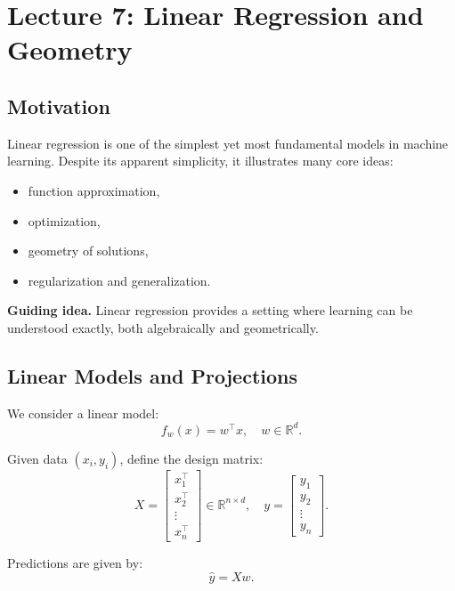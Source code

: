 \section{Lecture 7: Linear Regression and Geometry}

\subsection{Motivation}

Linear regression is one of the simplest yet most fundamental models in machine learning. Despite its apparent simplicity, it illustrates many core ideas:

\begin{itemize}
    \item function approximation,
    \item optimization,
    \item geometry of solutions,
    \item regularization and generalization.
\end{itemize}

\medskip

\noindent
\textbf{Guiding idea.}  
Linear regression provides a setting where learning can be understood exactly, both algebraically and geometrically.

\subsection{Linear Models and Projections}

We consider a linear model:
\[
f_w(x) = w^\top x, \quad w \in \mathbb{R}^d.
\]

\medskip

\noindent
Given data $(x_i, y_i)$, define the design matrix:
\[
X =
\begin{bmatrix}
x_1^\top \\
x_2^\top \\
\vdots \\
x_n^\top
\end{bmatrix}
\in \mathbb{R}^{n \times d}, \quad
y =
\begin{bmatrix}
y_1 \\
y_2 \\
\vdots \\
y_n
\end{bmatrix}.
\]

\medskip

\noindent
Predictions are given by:
\[
\hat{y} = Xw.
\]

